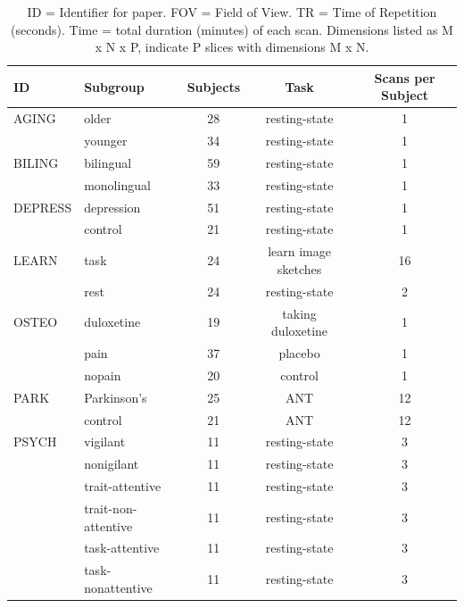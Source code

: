 \documentclass[12pt]{spieman}  %
\begin{document}
\begin{spacing}{2}
\begin{table}[h!]
\small
\centering
\begin{tabular}{ l l c c c }
\hline
\textbf{ID}  & \textbf{Subgroup}  & \textbf{Subjects}  & \textbf{Task} & \textbf{Scans per Subject} \\
\hline
AGING   &  older             & 28      & resting-state         & 1 \\
        &  younger           & 34      & resting-state         & 1 \\
\hline
BILING  &  bilingual          & 59      & resting-state        & 1 \\
        &  monolingual        & 33      & resting-state        & 1 \\
\hline
DEPRESS &  depression         & 51      & resting-state        & 1 \\
        &  control            & 21      & resting-state        & 1 \\
\hline
LEARN   &  task              & 24      & learn image sketches  & 16 \\
        &  rest              & 24      & resting-state         & 2 \\
\hline
OSTEO   &  duloxetine        & 19      & taking duloxetine     & 1 \\
        &  pain              & 37      & placebo               & 1 \\
        &  nopain            & 20      & control               & 1 \\
\hline
PARK    &  Parkinson's       & 25      & ANT                   & 12 \\
        &  control           & 21      & ANT                   & 12 \\
\hline
PSYCH   &  vigilant           & 11     & resting-state        & 3 \\
        &  nonigilant         & 11     & resting-state        & 3 \\
        &  trait-attentive     & 11    & resting-state        & 3 \\
        &  trait-non-attentive & 11    & resting-state        & 3 \\
        &  task-attentive     & 11     & resting-state        & 3 \\
        &  task-nonattentive  & 11     & resting-state        & 3 \\
\hline
\end{tabular}
\caption{
    ID = Identifier for paper. FOV = Field of View. TR = Time of Repetition (seconds).
    Time = total duration (minutes) of each scan. Dimensions listed as M x N x P,
    indicate P slices with dimensions M x N.
}
\label{table:2}
\end{table}


\end{spacing}
\end{document}
